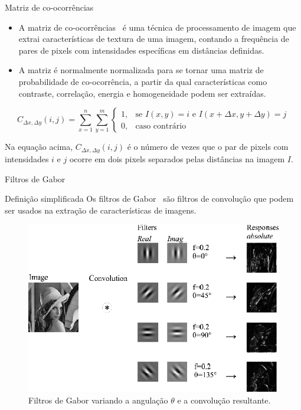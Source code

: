 \documentclass{templatebeamerufc/libs/ufc_format}
\begin{document}
\begin{frame}{Matriz de co-ocorrências}

  \begin{itemize}
  \item A matriz de co-ocorrências~\cite{haralick1979statistical} é uma técnica de processamento de
    imagem que extrai características de textura de uma imagem, contando a
    frequência de pares de pixels com intensidades específicas em
    distâncias definidas.
  \item A matriz é normalmente normalizada para se tornar uma matriz de
    probabilidade de co-ocorrência, a partir da qual características como
    contraste, correlação, energia e homogeneidade podem ser extraídas.
  \end{itemize}

  \begin{equation*}\label{eq:comatrix}
    C_{\Delta x, \Delta y}(i,j) = \sum_{x=1}^n\sum_{y=1}^m
    \begin{cases} 1, & \text{se }I(x,y)=i\text{ e }I(x+\Delta x, y+\Delta y)=j
      \\ 0, & \text{caso contrário}
    \end{cases}
  \end{equation*}

  Na equação acima, $C_{\Delta x, \Delta y}(i,j)$ é o número de vezes
  que o par de pixels com intensidades $i$ e $j$ ocorre em dois pixels
  separados pelas distâncias na imagem $I$.

  \vspace{1cm}
\end{frame}
\begin{frame}{Filtros de Gabor}
  \begin{block}{Definição simplificada}
      Os filtros de Gabor~\cite{daugman1988complete} são filtros de
convolução que podem ser usados na extração de características de
imagens.
  \end{block}
  \begin{figure}[!h]\label{fig:gabor-filters}
    \centering
    \caption{Filtros de Gabor variando a angulação $\theta$ e a convolução resultante.}
    \includegraphics[scale=0.3]{figuras/gabor-filters}
  \end{figure}
\end{frame}
\end{document}
